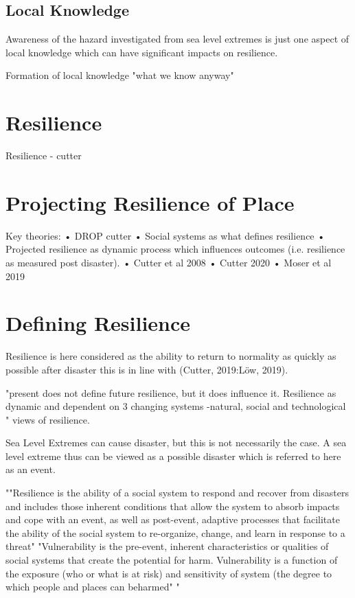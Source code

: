 \documentclass{article}
\begin{document}
\subsection{Local Knowledge}
Awareness of the hazard investigated from sea level extremes is just one aspect of local knowledge which can have significant impacts on resilience. 

Formation of local knowledge "what we know anyway" \cite{setten_we_2019}




\section{Resilience}
Resilience - cutter

\section{Projecting Resilience of Place}
Key theories:
•	DROP cutter
•	Social systems as what defines resilience
•	Projected resilience as dynamic process which influences outcomes (i.e. resilience as measured post disaster). 
•	Cutter et al 2008
•	Cutter 2020 
•	Moser et al 2019 

\section{Defining Resilience} 
Resilience is here considered as the ability to return to normality as quickly as possible after disaster this is in line with (Cutter, 2019:Löw, 2019).

"present does not define future resilience, but it does influence it. Resilience as dynamic and dependent on 3 changing systems -natural, social and technological
" \cite{cutter_community_2020} views of resilience.

Sea Level Extremes can cause disaster, but this is not necessarily the case. A sea level extreme thus can be viewed as a possible disaster which is referred to here as an event. 

""Resilience is the ability of a social system to respond and recover from disasters and includes those inherent conditions that allow the system to absorb impacts and cope with an event, as well as post-event, adaptive processes that facilitate the ability of the social system to re-organize, change, and learn in response to a threat" "Vulnerability is the pre-event, inherent characteristics or qualities of social systems that create the potential for harm. Vulnerability is a function of the exposure (who or what is at risk) and sensitivity of system (the degree to which people and places can beharmed" " \cite{cutter_place-based_2008}
\end{document}

